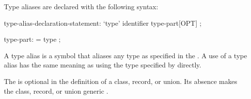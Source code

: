 Type aliases are declared with the following syntax:
\begin{syntax}
type-alias-declaration-statement:
  `type' identifier type-part[OPT] ;

type-part:
  = type ;
\end{syntax}
A type alias is a symbol that aliases any type as specified in the
.  A use of a type alias has the same meaning as using
the type specified by  directly.

The  is optional in the definition of a class, record,
or union.  Its absence makes the class, record, or union
generic .
